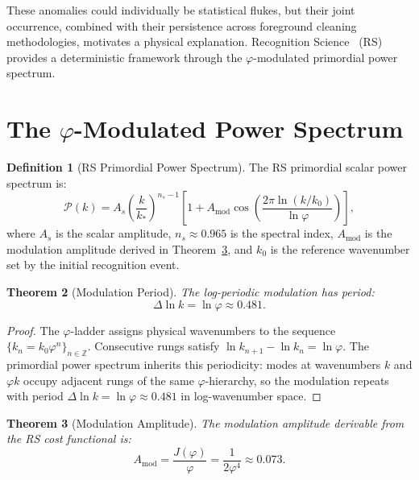 \documentclass[12pt,a4paper]{article}
\newtheorem{theorem}{Theorem}[section]
\theoremstyle{definition}
\newtheorem{definition}[theorem]{Definition}
\theoremstyle{remark}
\begin{document}
These anomalies could individually be statistical flukes, but their
joint occurrence, combined with their persistence across foreground
cleaning methodologies, motivates a physical explanation.  Recognition
Science~\cite{RS_Axioms} (RS) provides a deterministic framework through
the $\varphi$-modulated primordial power spectrum.

\section{The $\varphi$-Modulated Power Spectrum}
\label{sec:modulation}

\begin{definition}[RS Primordial Power Spectrum]
\label{def:spectrum}
The RS primordial scalar power spectrum is:
\begin{equation}
  \mathcal{P}(k) = A_s \left(\frac{k}{k_\ast}\right)^{n_s - 1}
  \left[1 + A_{\mathrm{mod}} \cos\!\left(\frac{2\pi\ln(k/k_0)}
  {\ln\varphi}\right)\right],
\end{equation}
where $A_s$ is the scalar amplitude, $n_s \approx 0.965$ is the
spectral index, $A_{\mathrm{mod}}$ is the modulation amplitude derived
in Theorem~\ref{thm:amplitude}, and $k_0$ is the reference wavenumber
set by the initial recognition event.
\end{definition}

\begin{theorem}[Modulation Period]
\label{thm:period}
The log-periodic modulation has period:
\begin{equation}
  \Delta\ln k = \ln\varphi \approx 0.481.
\end{equation}
\end{theorem}

\begin{proof}
The $\varphi$-ladder assigns physical wavenumbers to the sequence
$\{k_n = k_0 \varphi^n\}_{n \in \mathbb{Z}}$.  Consecutive rungs satisfy
$\ln k_{n+1} - \ln k_n = \ln\varphi$.  The primordial power spectrum
inherits this periodicity: modes at wavenumbers $k$ and $\varphi k$
occupy adjacent rungs of the same $\varphi$-hierarchy, so the modulation
repeats with period $\Delta\ln k = \ln\varphi \approx 0.481$ in
log-wavenumber space.
\end{proof}

\begin{theorem}[Modulation Amplitude]
\label{thm:amplitude}
The modulation amplitude derivable from the RS cost functional is:
\begin{equation}
  A_{\mathrm{mod}} = \frac{J(\varphi)}{\varphi}
    = \frac{1}{2\varphi^4} \approx 0.073.
\end{equation}
\end{theorem}
\end{document}
